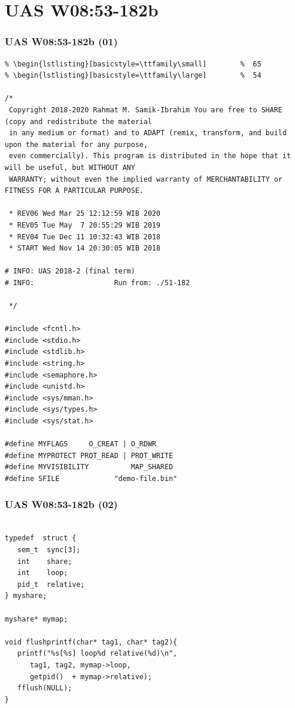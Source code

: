 \documentclass[xcolor=table, notheorems, hyperref={pdfpagelabels=false}]{beamer}
\begin{document}
\section{UAS W08:53-182b}
\begin{frame}[fragile]
\frametitle{UAS W08:53-182b (01)}
\begin{lstlisting}[basicstyle=\ttfamily\tiny]         % 108
% \begin{lstlisting}[basicstyle=\ttfamily\footnotesize] %  72
% \begin{lstlisting}[basicstyle=\ttfamily\small]        %  65
% \begin{lstlisting}[basicstyle=\ttfamily\large]        %  54

/*
 Copyright 2018-2020 Rahmat M. Samik-Ibrahim You are free to SHARE (copy and redistribute the material
 in any medium or format) and to ADAPT (remix, transform, and build upon the material for any purpose,
 even commercially). This program is distributed in the hope that it will be useful, but WITHOUT ANY
 WARRANTY; without even the implied warranty of MERCHANTABILITY or FITNESS FOR A PARTICULAR PURPOSE.

 * REV06 Wed Mar 25 12:12:59 WIB 2020
 * REV05 Tue May  7 20:55:29 WIB 2019
 * REV04 Tue Dec 11 10:32:43 WIB 2018
 * START Wed Nov 14 20:30:05 WIB 2018

# INFO: UAS 2018-2 (final term)
# INFO:                   Run from: ./51-182 

 */

#include <fcntl.h>
#include <stdio.h>
#include <stdlib.h>
#include <string.h>
#include <semaphore.h>
#include <unistd.h>
#include <sys/mman.h>
#include <sys/types.h>
#include <sys/stat.h>

#define MYFLAGS     O_CREAT | O_RDWR
#define MYPROTECT PROT_READ | PROT_WRITE
#define MYVISIBILITY          MAP_SHARED 
#define SFILE             "demo-file.bin"

\end{lstlisting}
\end{frame}

\begin{frame}[fragile]
\frametitle{UAS W08:53-182b (02)}
\begin{lstlisting}[basicstyle=\ttfamily\large]        %  54

typedef  struct {
   sem_t  sync[3];
   int    share;
   int    loop;
   pid_t  relative;
} myshare;

myshare* mymap;

void flushprintf(char* tag1, char* tag2){
   printf("%s[%s] loop%d relative(%d)\n", 
      tag1, tag2, mymap->loop, 
      getpid()  + mymap->relative);
   fflush(NULL);
}

\end{lstlisting}
\end{frame}
\end{document}

